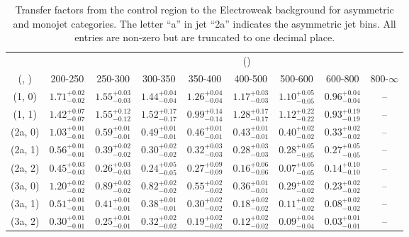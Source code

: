 \begin{table}[h!]
\tiny
\centering
\caption{Transfer factors from the \mj control region to the Electroweak background for asymmetric and monojet categories. The letter ``a'' in jet \eg ``2a''  indicates the asymmetric jet bins. All entries are non-zero but are truncated to one decimal place.\label{tab:tf_mu_total_asym}}
\begin{tabular}
{ccccccccc}
	\hline\hline
&	& \multicolumn{8}{c}{\scalht (\gev)} \\ 
	 (\njet,  \nb) & 200-250 & 250-300 & 300-350 & 350-400 & 400-500 & 500-600 & 600-800 & 800-$\infty$ \\ [0.8ex] 
\hline
	(1, 0) & $1.71^{+ 0.02 }_{- 0.02 }$ & $1.55^{+ 0.03 }_{- 0.03 }$ & $1.44^{+ 0.04 }_{- 0.04 }$ & $1.26^{+ 0.04 }_{- 0.04 }$ & $1.17^{+ 0.03 }_{- 0.03 }$ & $1.10^{+ 0.05 }_{- 0.05 }$ & $0.96^{+ 0.04 }_{- 0.04 }$ & -- \\[0.5ex] 
	(1, 1) & $1.42^{+ 0.07 }_{- 0.07 }$ & $1.55^{+ 0.12 }_{- 0.12 }$ & $1.52^{+ 0.17 }_{- 0.17 }$ & $0.99^{+ 0.14 }_{- 0.14 }$ & $1.28^{+ 0.17 }_{- 0.17 }$ & $1.12^{+ 0.22 }_{- 0.22 }$ & $0.93^{+ 0.19 }_{- 0.19 }$ & -- \\[0.5ex] 
	(2a, 0) & $1.03^{+ 0.01 }_{- 0.01 }$ & $0.59^{+ 0.01 }_{- 0.01 }$ & $0.49^{+ 0.01 }_{- 0.01 }$ & $0.46^{+ 0.01 }_{- 0.01 }$ & $0.43^{+ 0.01 }_{- 0.01 }$ & $0.40^{+ 0.02 }_{- 0.02 }$ & $0.33^{+ 0.02 }_{- 0.02 }$ & -- \\[0.5ex] 
	(2a, 1) & $0.56^{+ 0.01 }_{- 0.01 }$ & $0.39^{+ 0.02 }_{- 0.02 }$ & $0.30^{+ 0.02 }_{- 0.02 }$ & $0.32^{+ 0.03 }_{- 0.03 }$ & $0.28^{+ 0.03 }_{- 0.03 }$ & $0.28^{+ 0.05 }_{- 0.05 }$ & $0.27^{+ 0.05 }_{- 0.05 }$ & -- \\[0.5ex] 
	(2a, 2) & $0.45^{+ 0.03 }_{- 0.03 }$ & $0.26^{+ 0.03 }_{- 0.03 }$ & $0.24^{+ 0.05 }_{- 0.05 }$ & $0.27^{+ 0.09 }_{- 0.09 }$ & $0.16^{+ 0.06 }_{- 0.06 }$ & $0.07^{+ 0.05 }_{- 0.05 }$ & $0.14^{+ 0.10 }_{- 0.10 }$ & -- \\[0.5ex] 
	(3a, 0) & $1.20^{+ 0.02 }_{- 0.02 }$ & $0.89^{+ 0.02 }_{- 0.02 }$ & $0.82^{+ 0.02 }_{- 0.02 }$ & $0.55^{+ 0.02 }_{- 0.02 }$ & $0.36^{+ 0.01 }_{- 0.01 }$ & $0.29^{+ 0.02 }_{- 0.02 }$ & $0.23^{+ 0.02 }_{- 0.02 }$ & -- \\[0.5ex] 
	(3a, 1) & $0.51^{+ 0.01 }_{- 0.01 }$ & $0.41^{+ 0.01 }_{- 0.01 }$ & $0.38^{+ 0.01 }_{- 0.01 }$ & $0.30^{+ 0.02 }_{- 0.02 }$ & $0.18^{+ 0.02 }_{- 0.02 }$ & $0.11^{+ 0.02 }_{- 0.02 }$ & $0.08^{+ 0.02 }_{- 0.02 }$ & -- \\[0.5ex] 
	(3a, 2) & $0.30^{+ 0.01 }_{- 0.01 }$ & $0.25^{+ 0.01 }_{- 0.01 }$ & $0.32^{+ 0.02 }_{- 0.02 }$ & $0.19^{+ 0.02 }_{- 0.02 }$ & $0.12^{+ 0.02 }_{- 0.02 }$ & $0.09^{+ 0.04 }_{- 0.04 }$ & $0.03^{+ 0.01 }_{- 0.01 }$ & -- \\[0.5ex] 

\end{tabular}
\end{table}
